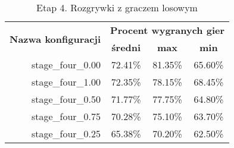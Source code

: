 \begin{longtable}[c]{|r|c|c|c|}
\caption{\label{tab:results/stage_four_all_with_random}Etap 4. Rozgrywki z graczem losowym} \\
\hline

\multirow{2}{*}{\textbf{Nazwa konfiguracji}} & \multicolumn{3}{|c|}{\textbf{Procent wygranych gier}} \\
\cline{2-4}
&\textbf{średni} & \textbf{max} & \textbf{min} \\
\hline
stage\_four\_0.00 & 72.41\% & 81.35\% & 65.60\% \\
\hline
stage\_four\_1.00 & 72.35\% & 78.15\% & 68.45\% \\
\hline
stage\_four\_0.50 & 71.77\% & 77.75\% & 64.80\% \\
\hline
stage\_four\_0.75 & 70.28\% & 75.10\% & 63.70\% \\
\hline
stage\_four\_0.25 & 65.38\% & 70.20\% & 62.50\% \\
\hline
\end{longtable}
